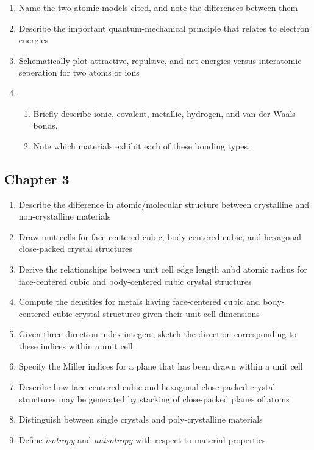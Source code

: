 \documentclass{article}
\begin{document}
\begin{enumerate}
    \item Name the two atomic models cited, and note the differences between them
    \item Describe the important quantum-mechanical principle that relates to electron energies
    \item Schematically plot attractive, repulsive, and net energies versus interatomic seperation for two atoms or ions
    \item \begin{enumerate}
        \item Briefly describe ionic, covalent, metallic, hydrogen, and van der Waals bonds.
        \item Note which materials exhibit each of these bonding types.
    \end{enumerate}
\end{enumerate}

\subsection{Chapter 3}

\begin{enumerate}
    \item Describe the difference in atomic/molecular structure between crystalline and non-crystalline materials
    \item Draw unit cells for face-centered cubic, body-centered cubic, and hexagonal close-packed crystal structures
    \item Derive the relationships between unit cell edge length anbd atomic radius for face-centered cubic and body-centered cubic crystal structures
    \item Compute the densities for metals having face-centered cubic and body-centered cubic crystal structures given their unit cell dimensions
    \item Given three direction index integers, sketch the direction corresponding to these indices within a unit cell
    \item Specify the Miller indices for a plane that has been drawn within a unit cell
    \item Describe how face-centered cubic and hexagonal close-packed crystal structures may be generated by stacking of close-packed planes of atoms
    \item Distinguish between single crystals and poly-crystalline materials
    \item Define \textit{isotropy} and \textit{anisotropy} with respect to material properties
\end{enumerate}
\end{document}
